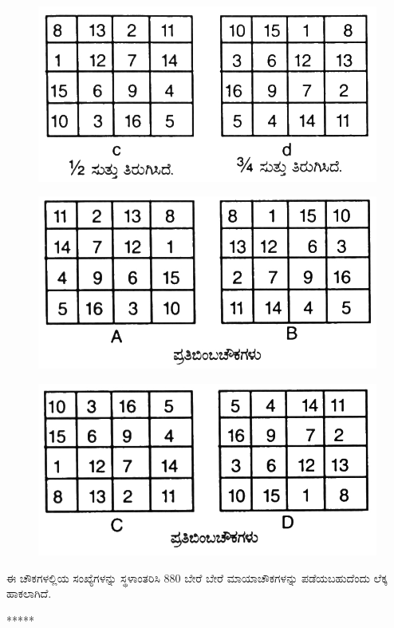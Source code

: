 \begin{figure}[H]
\includegraphics[scale=.75]{src/figures/chap4/fig4.12.jpg}
\end{figure}
\begin{figure}[H]
\includegraphics[scale=.75]{src/figures/chap4/fig4.13.jpg}
\end{figure}
\begin{figure}[H]
\includegraphics[scale=.75]{src/figures/chap4/fig4.14.jpg}
\end{figure}

ಈ ಚೌಕಗಳಲ್ಲಿಯ ಸಂಖ್ಯೆಗಳನ್ನು ಸ್ಥಳಾಂತರಿಸಿ 880 ಬೇರೆ ಬೇರೆ ಮಾಯಾಚೌಕಗಳನ್ನು ಪಡೆಯಬಹುದೆಂದು ಲೆಕ್ಕ ಹಾಕಲಾಗಿದೆ.
\begin{center}
*****
\end{center}

